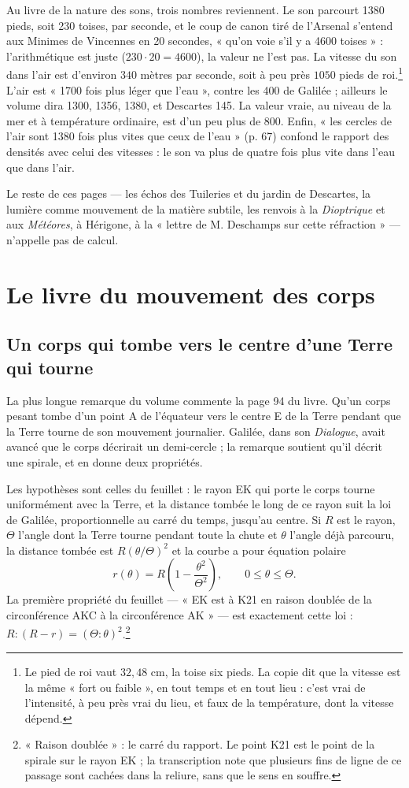 \documentclass[11pt,a4paper]{article}
\begin{document}
Au livre de la nature des sons, trois nombres reviennent. Le son parcourt 1380
pieds, soit 230 toises, par seconde, et le coup de canon tiré de l'Arsenal
s'entend aux Minimes de Vincennes en 20 secondes, « qu'on voie s'il y a 4600
toises » : l'arithmétique est juste ($230 \cdot 20 = 4600$), la valeur ne l'est
pas. La vitesse du son dans l'air est d'environ $340$ mètres par seconde, soit
à peu près $1050$ pieds de roi.\footnote{Le pied de roi vaut $32{,}48$ cm, la
toise six pieds. La copie dit que la vitesse est la même « fort ou faible »,
en tout temps et en tout lieu : c'est vrai de l'intensité, à peu près vrai du
lieu, et faux de la température, dont la vitesse dépend.} L'air est « 1700 fois
plus léger que l'eau », contre les 400 de Galilée ; ailleurs le volume dira
1300, 1356, 1380, et Descartes 145. La valeur vraie, au niveau de la mer et à
température ordinaire, est d'un peu plus de 800. Enfin, « les cercles de l'air
sont 1380 fois plus vites que ceux de l'eau » (p. 67) confond le rapport des
densités avec celui des vitesses : le son va plus de quatre fois plus
vite dans l'eau que dans l'air.

Le reste de ces pages — les échos des Tuileries et du jardin de Descartes, la
lumière comme mouvement de la matière subtile, les renvois à la
\emph{Dioptrique} et aux \emph{Météores}, à Hérigone, à la « lettre de
M. Deschamps sur cette réfraction » — n'appelle pas de calcul.

\section*{Le livre du mouvement des corps}

\subsection*{Un corps qui tombe vers le centre d'une Terre qui tourne}

La plus longue remarque du volume commente la page 94 du livre. Qu'un corps
pesant tombe d'un point A de l'équateur vers le centre E de la Terre pendant
que la Terre tourne de son mouvement journalier. Galilée, dans son
\emph{Dialogue}, avait avancé que le corps décrirait un demi-cercle ; la
remarque soutient qu'il décrit une spirale, et en donne deux propriétés.

Les hypothèses sont celles du feuillet : le rayon EK qui porte le corps tourne
uniformément avec la Terre, et la distance tombée le long de ce rayon suit la
loi de Galilée, proportionnelle au carré du temps, jusqu'au centre. Si $R$ est
le rayon, $\Theta$ l'angle dont la Terre tourne pendant toute la chute et
$\theta$ l'angle déjà parcouru, la distance tombée est $R(\theta/\Theta)^2$ et
la courbe a pour équation polaire
\[
r(\theta) = R\left(1 - \frac{\theta^2}{\Theta^2}\right), \qquad
0 \le \theta \le \Theta .
\]
La première propriété du feuillet — « EK est à K21 en raison doublée de la
circonférence AKC à la circonférence AK » — est exactement cette loi :
$R : (R - r) = (\Theta : \theta)^2$.\footnote{« Raison doublée » : le carré du
rapport. Le point K21 est le point de la spirale sur le rayon EK ; la
transcription note que plusieurs fins de ligne de ce passage sont cachées dans
la reliure, sans que le sens en souffre.}
\end{document}
